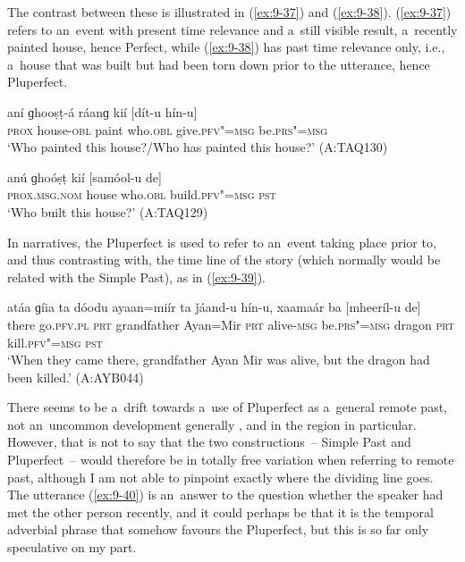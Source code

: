 The contrast between these is illustrated in (\ref{ex:9-37}) and (\ref{ex:9-38}). (\ref{ex:9-37}) refers to an~event with present time relevance and a~still visible result, a~recently painted house, hence Perfect, while (\ref{ex:9-38}) has past time relevance only, i.e., a~house that was built but had been torn down prior to the utterance, hence Pluperfect.

\begin{exe}
\ex
\label{ex:9-37}
\gll aní ɡhooṣṭ-á ráanɡ kií [dít-u hín-u]  \\
\textsc{prox} house-\textsc{obl} paint who.\textsc{obl} give.\textsc{pfv"=msg} be.\textsc{prs"=msg} \\
\glt `Who painted this house?/Who has painted this house?' (A:TAQ130)

\ex
\label{ex:9-38}
\gll anú ɡhoóṣṭ kií [samóol-u de] \\
\textsc{prox.msg.nom} house who.\textsc{obl} build.\textsc{pfv"=msg} \textsc{pst} \\
\glt `Who built this house?' (A:TAQ129)
\end{exe}

In narratives, the Pluperfect is used to refer to an~event taking place prior to, and thus contrasting with, the time line of the story (which normally would be related with the Simple Past), as in (\ref{ex:9-39}).

\begin{exe}
\ex
\label{ex:9-39}
\gll atáa ɡíia ta dóodu ayaan=miír ta ǰáand-u hín-u, xaamaár ba [mheeríl-u de] \\
there go.\textsc{pfv.pl} \textsc{prt} grandfather Ayan=Mir \textsc{prt}  alive-\textsc{msg}
be.\textsc{prs"=msg} dragon \textsc{prt} kill.\textsc{pfv"=msg} \textsc{pst} \\
\glt `When they came there, grandfather Ayan Mir was alive, but the dragon had been killed.' (A:AYB044) 
\end{exe}

There seems to be a~drift towards a~use of Pluperfect as a~general remote past, not an~uncommon development generally \citep[147]{dahl1985}, and in the region in particular. However, that is not to say that the two constructions~-- Simple Past and Pluperfect~-- would therefore be in totally free variation when referring to remote past, although I am not able to pinpoint exactly where the dividing line goes. The utterance (\ref{ex:9-40}) is an~answer to the question whether the speaker had met the other person recently, and it could perhaps be that it is the temporal adverbial phrase that somehow favours the Pluperfect, but this is so far only speculative on my part.

